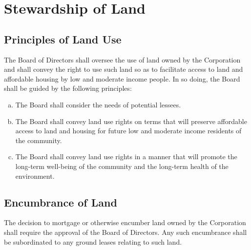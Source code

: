 \section{Stewardship of Land}

\subsection{Principles of Land Use}
The Board of Directors shall oversee the use of land owned by the
Corporation and shall convey the right to use such land so as to
facilitate access to land and affordable housing by low and moderate
income people. In so doing, the Board shall be guided by the following
principles:
\begin{enumerate}[a.]
\item The Board shall consider the needs of potential lessees.
\item The Board shall convey land use rights on terms that will
  preserve affordable access to land and housing for future low and
  moderate income residents of the community.
\item The Board shall convey land use rights in a manner that will
  promote the long-term well-being of the community and the long-term
  health of the environment.
\end{enumerate}

\subsection{Encumbrance of Land}
The decision to mortgage or otherwise encumber land owned by the
Corporation shall require the approval of the Board of Directors. Any
such encumbrance shall be subordinated to any ground leases relating
to such land.

